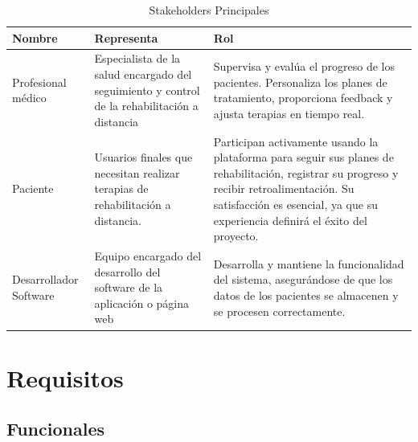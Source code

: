 \documentclass{article}
\begin{document}
	\begin{table}[ht]
		\centering
		\caption{Stakeholders Principales}
		\begin{tabular}{@{} p{3cm} p{6cm} p{7cm} @{}}
			\toprule
			\textbf{Nombre} & \textbf{Representa} & \textbf{Rol} \\
			\midrule
			Profesional médico & 
			Especialista de la salud encargado del seguimiento y control de la rehabilitación a distancia & 
			Supervisa y evalúa el progreso de los pacientes. \newline Personaliza los planes de tratamiento, proporciona feedback y ajusta terapias en tiempo real. \\
			
			\addlinespace
			
			Paciente & 
			Usuarios finales que necesitan realizar terapias de rehabilitación a distancia. & 
			Participan activamente usando la plataforma para seguir sus planes de rehabilitación, registrar su progreso y recibir retroalimentación. Su satisfacción es esencial, ya que su experiencia definirá el éxito del proyecto. \\
			
			\addlinespace
			
			Desarrollador  Software & 
			Equipo encargado del desarrollo del software de la aplicación o página web & 
			Desarrolla y mantiene la funcionalidad del sistema, asegurándose de que los datos de los pacientes se almacenen y se procesen correctamente. \\
			\bottomrule
		\end{tabular}
	\end{table}
	
	

	
	
	\section{Requisitos}
	
	\subsection{Funcionales}
	
\end{document}
